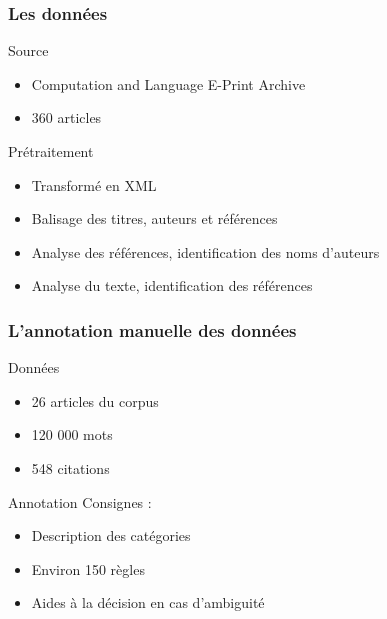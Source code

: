 \documentclass[10pt]{beamer}
\begin{document}
\begin{frame}
  \frametitle{Les données}
  
  \begin{block}{Source}
	  \begin{itemize}
		\item Computation and Language E-Print Archive
		\item 360 articles
	  \end{itemize}
  \end{block}
  
  \begin{block}{Prétraitement}
	  \begin{itemize}
		\item Transformé en XML
		\item Balisage des titres, auteurs et références
		\item Analyse des références, identification des noms d'auteurs
		\item Analyse du texte, identification des références
	  \end{itemize}
  \end{block}
\end{frame}

\begin{frame}
  \frametitle{L'annotation manuelle des données}
  
  \begin{block}{Données}
	  \begin{itemize}
		\item 26 articles du corpus
		\item 120 000 mots
		\item 548 citations
	  \end{itemize}
  \end{block}
  
  \begin{block}{Annotation}
  	Consignes :
	  \begin{itemize}
		\item Description des catégories
		\item Environ 150 règles
		\item Aides à la décision en cas d'ambiguité
	  \end{itemize}
  \end{block}
\end{frame}
\end{document}
